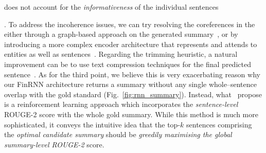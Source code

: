 \begin{itemize}
\begin{enumerate*}[label=(\alph*)]
            \item does not account for the \emph{informativeness} of the individual sentences
        \end{enumerate*}.
        To address the incoherence issues, we can try resolving the coreferences in the either through a
        graph-based approach on the generated summary~\cite{sonawane2016coreference}, or by introducing a more complex
        encoder architecture that represents and attends to entities as well as sentences~\cite{Huang2021ExtractiveSC}.
        Regarding the trimming heuristic, a natural improvement can be to use text compression techniques for the final predicted sentence~\cite{ghalandari2022efficient, KNIGHT200291}.
        As for the third point, we believe this is very exacerbating reason why our FinRNN architecture returns a summary
        without any single whole--sentence overlap with the gold standard (Fig.~\ref{fig:rnn_summary}).
        Instead, what~\cite{zmandar-etal-2021-joint} propose is a reinforcement learning approach which incorporates
        the \emph{sentence-level} ROUGE-2 score with the whole gold summary.
        While this method is much more sophisticated, it conveys the intuitive idea that the top-$k$ sentences comprising the
        \emph{optimal candidate summary} should be \emph{greedily maximising the global summary-level ROUGE-2} score.
\end{itemize}

